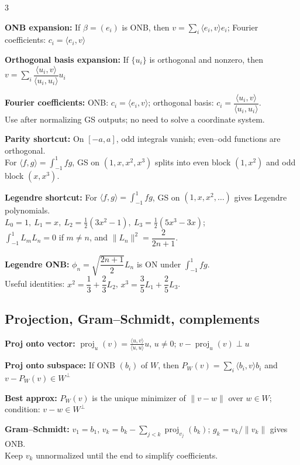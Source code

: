 \documentclass[10pt]{article}
\newcommand{\proj}{\operatorname{proj}}
\newcommand{\ip}[2]{\langle #1,#2\rangle}
\newenvironment{cheatitems}{\par\vspace{-1pt}}{\par\vspace{-1pt}}
\newcommand{\cheatrow}[2]{%
  \par\noindent\textbf{#1:}\nobreak\enspace #2\par
}
\begin{document}
\begin{multicols}{3}
\begin{cheatitems}
\cheatrow{ONB expansion}{
If $\beta=(e_i)$ is ONB, then
$v=\sum_i \ip{e_i}{v}e_i$; Fourier coefficients: $c_i=\ip{e_i}{v}$
}

\cheatrow{Orthogonal basis expansion}{
If $\{u_i\}$ is orthogonal and nonzero, then
$v=\sum_i \dfrac{\ip{u_i}{v}}{\ip{u_i}{u_i}}u_i$
}

\cheatrow{Fourier coefficients}{
ONB: $c_i=\ip{e_i}{v}$; orthogonal basis: 
$c_i=\dfrac{\ip{u_i}{v}}{\ip{u_i}{u_i}}$.\\
Use after normalizing GS outputs; no need to solve a coordinate system.
}

\cheatrow{Parity shortcut}{
On $[-a,a]$, odd integrals vanish; even--odd functions are orthogonal.\\
For $\ip{f}{g}=\int_{-1}^{1}fg$, GS on $(1,x,x^2,x^3)$ splits into even block $(1,x^2)$ and odd block $(x,x^3)$.
}

\cheatrow{Legendre shortcut}{
For $\ip{f}{g}=\int_{-1}^{1}fg$, GS on $(1,x,x^2,\dots)$ gives Legendre polynomials.\\
$L_0=1,\ L_1=x,\ L_2=\frac12(3x^2-1),\ L_3=\frac12(5x^3-3x)$;\\
$\int_{-1}^{1}L_mL_n=0$ if $m\ne n$, and $\|L_n\|^2=\dfrac{2}{2n+1}$.
}

\cheatrow{Legendre ONB}{
$\phi_n=\sqrt{\dfrac{2n+1}{2}}L_n$ is ON under $\int_{-1}^{1}fg$.\\
Useful identities:
$x^2=\dfrac13+\dfrac23L_2$, 
$x^3=\dfrac35L_1+\dfrac25L_3$.
}

\end{cheatitems}



\subsection*{Projection, Gram--Schmidt, complements}
\begin{cheatitems}

\cheatrow{Proj onto vector}{
$\proj_u(v)=\frac{\ip{u}{v}}{\ip{u}{u}}u$, $u\neq0$; $v-\proj_u(v)\perp u$
}

\cheatrow{Proj onto subspace}{
If ONB $(b_i)$ of $W$, then
$P_W(v)=\sum_i \ip{b_i}{v}b_i$ and $v-P_W(v)\in W^\perp$
}

\cheatrow{Best approx}{
$P_W(v)$ is the unique minimizer of $\|v-w\|$ over $w\in W$;  
condition: $v-w\in W^\perp$
}

\cheatrow{Gram--Schmidt}{
$v_1=b_1$, 
$v_k=b_k-\sum_{j<k}\proj_{v_j}(b_k)$;  
$g_k=v_k/\|v_k\|$ gives ONB.\\
Keep $v_k$ unnormalized until the end to simplify coefficients.
}


\end{cheatitems}
\end{multicols}
\end{document}
